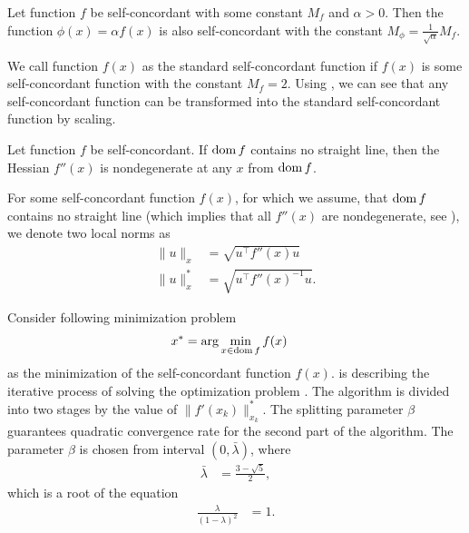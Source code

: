 \begin{corollary}
  Let function $f$ be self-concordant with some constant $M_f$ and $\alpha > 0$. Then the function $\phi(x) = \alpha f(x)$ is also self-concordant with the constant $M_\phi = \frac{1}{\sqrt{\alpha}}M_f$.
\end{corollary}

We call function $f(x)$ as the standard self-concordant function if $f(x)$ is some self-concordant function with the constant $M_f = 2$. Using , we can see that any self-concordant function can be transformed into the standard self-concordant function by scaling.

\begin{theorem}
  Let function $f$ be self-concordant. If $\operatorname{dom} f$ contains no straight line, then the Hessian $f''(x)$ is nondegenerate at any $x$ from $\operatorname{dom} f$.
\end{theorem}

For some self-concordant function $f(x)$, for which we assume, that $\operatorname{dom} f$ contains no straight line (which implies that all $f''(x)$ are nondegenerate, see ), we denote two local norms as
\begin{align}
  \| u \|_x &= \sqrt{u^\top f''(x) u}\\
  \| u \|_x^* &= \sqrt{u^\top f''(x)^{-1} u}.
\end{align}

Consider following minimization problem
\begin{align}
  x^* &= \arg\min_{x\in\dom f} f(x)\labeleq{SDP:scf:minProblem}
\end{align}
as the minimization of the self-concordant function $f(x)$.
 is describing the iterative process of solving the optimization problem .
The algorithm is divided into two stages by the value of $\|f'(x_k)\|_{x_k}^*$.
The splitting parameter $\beta$ guarantees quadratic convergence rate for the second part of the algorithm. The parameter $\beta$ is chosen from interval $(0, \bar{\lambda})$, where
\begin{align}
  \bar{\lambda} &= \frac{3 - \sqrt{5}}{2},
\end{align}
which is a root of the equation
\begin{align}
  \frac{\lambda}{(1-\lambda)^2} &= 1.
\end{align}



